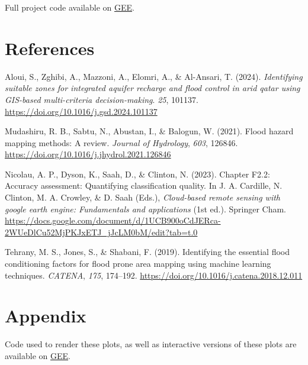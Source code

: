 \documentclass[
]{agujournal2019}
\newlength{\cslhangindent}
\newenvironment{CSLReferences}[2] %
 {\begin{list}{}{%
  \setlength{\itemindent}{0pt}
  \setlength{\leftmargin}{0pt}
  \setlength{\parsep}{0pt}
  \ifodd #1
   \setlength{\leftmargin}{\cslhangindent}
   \setlength{\itemindent}{-1\cslhangindent}
  \fi
  \setlength{\itemsep}{#2\baselineskip}}}
 {\end{list}}
\begin{document}
Full project code available on
\href{https://code.earthengine.google.com/4a9b1dba779c649e0b79578d595d2ff5}{GEE}.

\section*{References}\label{references}

\label{refs}
\begin{CSLReferences}{1}{0}
\vspace{1em}

Aloui, S., Zghibi, A., Mazzoni, A., Elomri, A., \& Al-Ansari, T. (2024).
\emph{Identifying suitable zones for integrated aquifer recharge and
flood control in arid qatar using GIS-based multi-criteria
decision-making}. \emph{25}, 101137.
\url{https://doi.org/10.1016/j.gsd.2024.101137}

Mudashiru, R. B., Sabtu, N., Abustan, I., \& Balogun, W. (2021). Flood
hazard mapping methods: A review. \emph{Journal of Hydrology},
\emph{603}, 126846. \url{https://doi.org/10.1016/j.jhydrol.2021.126846}

Nicolau, A. P., Dyson, K., Saah, D., \& Clinton, N. (2023). Chapter
F2.2: Accuracy assessment: Quantifying classification quality. In J. A.
Cardille, N. Clinton, M. A. Crowley, \& D. Saah (Eds.),
\emph{Cloud-based remote sensing with google earth engine: Fundamentals
and applications} (1st ed.). Springer Cham.
\url{https://docs.google.com/document/d/1UCB900oCdJERca-2WUeDlCu52MjPKJxETJ_jJcLM0bM/edit?tab=t.0}

Tehrany, M. S., Jones, S., \& Shabani, F. (2019). Identifying the
essential flood conditioning factors for flood prone area mapping using
machine learning techniques. \emph{CATENA}, \emph{175}, 174--192.
\url{https://doi.org/10.1016/j.catena.2018.12.011}

\end{CSLReferences}

\section{Appendix}\label{appendix}

Code used to render these plots, as well as interactive versions of
these plots are available on
\href{https://code.earthengine.google.com/5d33d4d4b06092127e3e3c5233878ef3}{GEE}.
\end{document}
